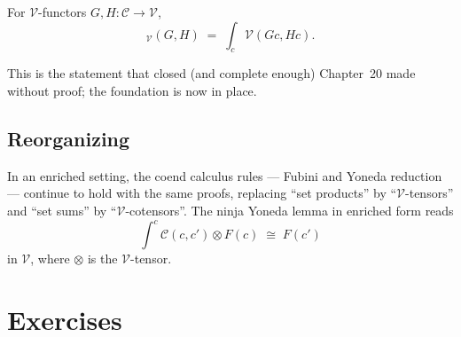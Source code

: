\begin{proposition}
For $\mathcal{V}$-functors $G, H : \mathcal{C} \to \mathcal{V}$,
\begin{equation*}
  [\mathcal{C}, \mathcal{V}]_\mathcal{V}(G, H) \;=\; \int_c \mathcal{V}(G c, H c).
\end{equation*}
\end{proposition}

This is the statement that closed (and complete enough) Chapter~20 made
without proof; the foundation is now in place.

\subsection{Reorganizing}

In an enriched setting, the coend calculus rules — Fubini and Yoneda
reduction — continue to hold with the same proofs, replacing ``set
products'' by ``$\mathcal{V}$-tensors'' and ``set sums'' by
``$\mathcal{V}$-cotensors''. The ninja Yoneda lemma in enriched form reads
\begin{equation*}
  \int^c \mathcal{C}(c, c') \otimes F(c) \;\cong\; F(c')
\end{equation*}
in $\mathcal{V}$, where $\otimes$ is the $\mathcal{V}$-tensor.


\section{Exercises}
\label{sec:end-coend-exercises}

